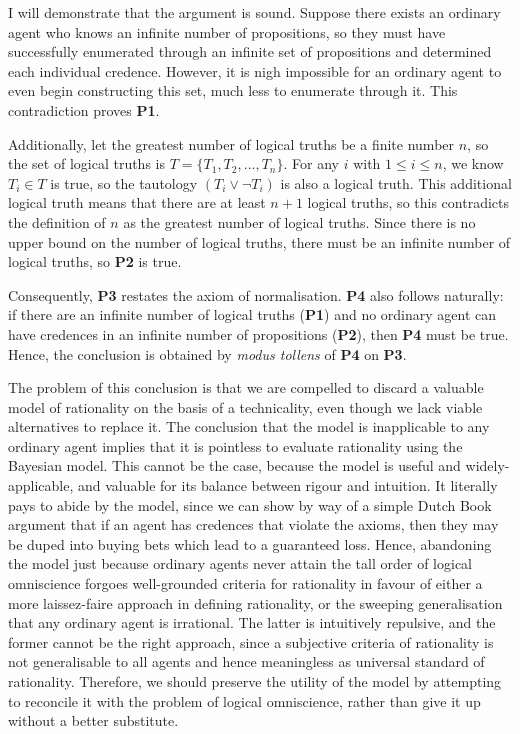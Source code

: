 \documentclass[12pt]{article}
\begin{document}
I will demonstrate that the argument is sound. Suppose there exists an ordinary agent who knows an infinite number of propositions, so they must have successfully enumerated through an infinite set of propositions and determined each individual credence. However, it is nigh impossible for an ordinary agent to even begin constructing this set, much less to enumerate through it. This contradiction proves \textbf{P1}.

Additionally, let the greatest number of logical truths be a finite number $n$, so the set of logical truths is $T=\{T_1,T_2,...,T_n\}$. For any $i$ with $1\leq i\leq n$, we know $T_i\in T$ is true, so the tautology $(T_i\lor\lnot T_i)$ is also a logical truth. This additional logical truth means that there are at least $n+1$ logical truths, so this contradicts the definition of $n$ as the greatest number of logical truths. Since there is no upper bound on the number of logical truths, there must be an infinite number of logical truths, so \textbf{P2} is true.

Consequently, \textbf{P3} restates the axiom of normalisation. \textbf{P4} also follows naturally: if there are an infinite number of logical truths (\textbf{P1}) and no ordinary agent can have credences in an infinite number of propositions (\textbf{P2}), then \textbf{P4} must be true. Hence, the conclusion is obtained by \textit{modus tollens} of \textbf{P4} on \textbf{P3}.

The problem of this conclusion is that we are compelled to discard a valuable model of rationality on the basis of a technicality, even though we lack viable alternatives to replace it. The conclusion that the model is inapplicable to any ordinary agent implies that it is pointless to evaluate rationality using the Bayesian model. This cannot be the case, because the model is useful and widely-applicable, and valuable for its balance between rigour and intuition. It literally pays to abide by the model, since we can show by way of a simple Dutch Book argument that if an agent has credences that violate the axioms, then they may be duped into buying bets which lead to a guaranteed loss.\autocite[44]{bdrc} Hence, abandoning the model just because ordinary agents never attain the tall order of logical omniscience forgoes well-grounded criteria for rationality in favour of either a more laissez-faire approach in defining rationality, or the sweeping generalisation that any ordinary agent is irrational. The latter is intuitively repulsive, and the former cannot be the right approach, since a subjective criteria of rationality is not generalisable to all agents and hence meaningless as universal standard of rationality. Therefore, we should preserve the utility of the model by attempting to reconcile it with the problem of logical omniscience, rather than give it up without a better substitute.
\end{document}
